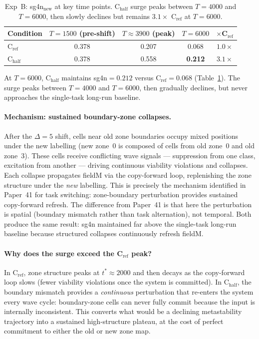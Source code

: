 \documentclass[11pt]{article}
\begin{document}
\begin{table}[h]
  \centering
  \caption{Exp~B: sg4n$_\mathrm{new}$ at key time points.  C$_\mathrm{half}$
           surge peaks between $T=4000$ and $T=6000$, then slowly declines
           but remains $3.1\times$ C$_\mathrm{ref}$ at $T=6000$.}
  \label{tab:expb}
  \small
  \begin{tabular}{lcccc}
    \toprule
    Condition & $T=1500$ (pre-shift) & $T\approx3900$ (peak) & $T=6000$ & $\times$C$_\mathrm{ref}$ \\
    \midrule
    C$_\mathrm{ref}$  & 0.378 & 0.207 & 0.068 & $1.0\times$ \\
    C$_\mathrm{half}$ & 0.378 & 0.558 & \textbf{0.212} & $3.1\times$ \\
    \bottomrule
  \end{tabular}
\end{table}

At $T=6000$, C$_\mathrm{half}$ maintains sg4n$=0.212$ versus C$_\mathrm{ref}=0.068$
(Table~\ref{tab:expb}).
The surge peaks between $T=4000$ and $T=6000$, then gradually declines, but
never approaches the single-task long-run baseline.

\paragraph{Mechanism: sustained boundary-zone collapses.}
After the $\Delta=5$ shift, cells near old zone boundaries occupy mixed
positions under the new labelling (new zone~0 is composed of cells from old
zone~0 and old zone~3).
These cells receive conflicting wave signals --- suppression from one class,
excitation from another --- driving continuous viability violations and
collapses.
Each collapse propagates fieldM via the copy-forward loop, replenishing
the zone structure under the \emph{new} labelling.
This is precisely the mechanism identified in Paper~41 for task switching:
zone-boundary perturbation provides sustained copy-forward refresh.
The difference from Paper~41 is that here the perturbation is spatial
(boundary mismatch rather than task alternation), not temporal.
Both produce the same result: sg4n maintained far above the single-task
long-run baseline because structured collapses continuously refresh fieldM.

\paragraph{Why does the surge exceed the C$_\mathrm{ref}$ peak?}
In C$_\mathrm{ref}$, zone structure peaks at $t^*\approx 2000$ and then
decays as the copy-forward loop slows (fewer viability violations once the
system is committed).
In C$_\mathrm{half}$, the boundary mismatch provides a \emph{continuous}
perturbation that re-enters the system every wave cycle: boundary-zone cells
can never fully commit because the input is internally inconsistent.
This converts what would be a declining metastability trajectory into a
sustained high-structure plateau, at the cost of perfect commitment to
either the old or new zone map.
\end{document}
